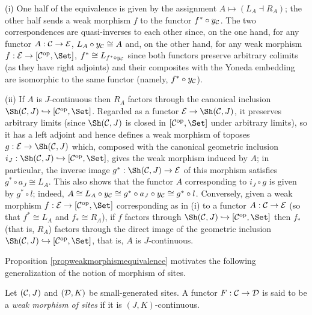 \documentclass[a4paper,12pt]{article}
\begin{document}
\begin{proofs}
	(i) One half of the equivalence is given by the assignment $A \mapsto (L_{A}\dashv R_{A})$; the other half sends a weak morphism $f$ to the functor $f^{\ast}\circ y_{\cal C}$. The two correspondences are quasi-inverses to each other since, on the one hand, for any functor $A:{\cal C}\to {\cal E}$, $L_{A}\circ y_{\cal C}\cong A$ and, on the other hand, for any weak morphism $f:{\cal E}\to [{\cal C}^{\textup{op}}, \Set]$, $f^{\ast}\cong L_{f^{\ast}\circ y_{\cal C}}$ since both functors preserve arbitrary colimits (as they have right adjoints) and their composites with the Yoneda embedding are isomorphic to the same functor (namely, $f^{\ast}\circ y_{\cal C}$).
	
	(ii) If $A$ is $J$-continuous then $R_{A}$ factors through the canonical inclusion $\Sh({\cal C}, J)\hookrightarrow [{\cal C}^{\textup{op}}, \Set]$. Regarded as a functor ${\cal E}\to \Sh({\cal C}, J)$, it preserves arbitrary limits (since $\Sh({\cal C}, J)$ is closed in $[{\cal C}^{\textup{op}}, \Set]$ under arbitrary limits), so it has a left adjoint and hence defines a weak morphism of toposes $g:{\cal E}\to \Sh({\cal C}, J)$ which, composed with the canonical geometric inclusion $i_{J}:\Sh({\cal C}, J)\hookrightarrow [{\cal C}^{\textup{op}}, \Set]$, gives the weak morphism induced by $A$; in particular, the inverse image $g^{\ast}:\Sh({\cal C}, J) \to {\cal E}$ of this morphism satisfies $g^{\ast}\circ a_{J}\cong L_{A}$. This also shows that the functor $A$ corresponding to $i_{J}\circ g$ is given by $g^{\ast}\circ l$; indeed, $A\cong L_{A}\circ y_{\cal C}\cong g^{\ast}\circ a_{J}\circ y_{\cal C}\cong g^{\ast}\circ l$. Conversely, given a weak morphism $f:{\cal E}\to [{\cal C}^{\textup{op}}, \Set]$ corresponding as in (i) to a functor $A:{\cal C}\to {\cal E}$ (so that $f^{\ast}\cong L_{A}$ and $f_{\ast}\cong R_{A}$), if $f$ factors through $\Sh({\cal C}, J)\hookrightarrow [{\cal C}^{\textup{op}}, \Set]$ then $f_{\ast}$ (that is, $R_{A}$) factors through the direct image of the geometric inclusion $\Sh({\cal C}, J)\hookrightarrow [{\cal C}^{\textup{op}}, \Set]$, that is, $A$ is $J$-continuous.	
\end{proofs}

Proposition \ref{propweakmorphismequivalence} motivates the following generalization of the notion of morphism of sites.

\begin{definition}
	Let $({\cal C}, J)$ and $({\cal D}, K)$ be small-generated sites. A functor $F:{\cal C}\to {\cal D}$ is said to be a \emph{weak morphism of sites} if it is $(J, K)$-continuous. 
\end{definition}
\end{document}
